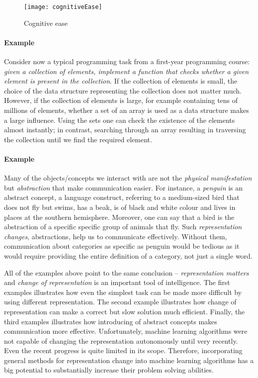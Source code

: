\begin{figure}
	\centering
	\texttt{[image: cognitiveEase]}
	\caption{Cognitive ease}
	\label{fig:cogease}
\end{figure}



\paragraph{Example} Consider now a typical programming task from a first-year programming course: \textit{given a collection of elements, implement a function that checks whether a given element is present in the collection}.
If the collection of elements is small, the choice of the data structure representing the collection does not matter much.
However, if the collection of elements is large, for example containing tens of millions of elements, whether a set of an array is used as a data structure makes a large influence.
Using the sets one can check the existence of the elements almost instantly; in contrast, searching through an array resulting in traversing the collection until we find the required element.



\paragraph{Example} 
Many of the objects/concepts we interact with are not the \textit{physical manifestation} but \textit{abstraction} that make communication easier.
For instance, a \textit{penguin} is an abstract concept, a language construct, referring to a medium-sized bird that does not fly but swims, has a beak, is of black and white colour and lives in places at the southern hemisphere.
Moreover, one can say that a bird is the abstraction of a specific specific group of animals that fly.
Such \textit{representation changes}, abstractions, help us to communicate effectively.
Without them, communication about categories as specific as penguin would be tedious as it would  require providing the entire definition of a category, not just a single word.




All of the examples above point to the same conclusion -- \textit{representation matters} and \textit{change of representation} is an important tool of intelligence.
The first examples illustrates how even the simplest task can be made more difficult by using different representation.
The second example illustrates how change of representation can make a correct but slow solution much efficient.
Finally, the third examples illustrates how introducing of abstract concepts makes communication more effective.
Unfortunately, machine learning algorithms were not capable of changing the representation autonomously until very recently.
Even the recent progress is quite limited in its scope.
Therefore, incorporating general methods for representation change into machine learning algorithms has a big potential to substantially increase their problem solving abilities.






